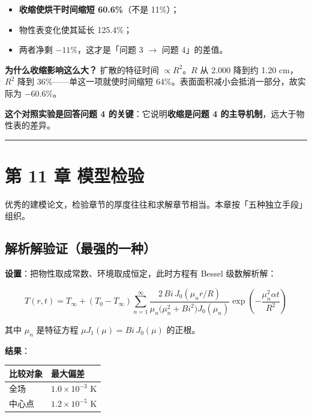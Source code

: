 \begin{itemize}
\item \textbf{收缩使烘干时间缩短 60.6\%}（不是 11\%）；
\item 物性表变化使其延长 125.4\%；
\item 两者净剩 $-11\%$，这才是「问题 3 $\rightarrow$ 问题 4」的差值。
\end{itemize}


\textbf{为什么收缩影响这么大？} 扩散的特征时间 $\propto R^2$。$R$ 从 2.000 降到约 1.20 cm，$R^2$ 降到 $36\%$——单这一项就使时间缩短 64\%。表面面积减小会抵消一部分，故实际为 $-60.6\%$。


\textbf{这个对照实验是回答问题 4 的关键}：它说明\textbf{收缩是问题 4 的主导机制}，远大于物性表的差异。


\vspace{1mm}\hrule\vspace{1mm}


\section{第 11 章 模型检验}


优秀的建模论文，检验章节的厚度往往和求解章节相当。本章按「五种独立手段」组织。


\subsection{解析解验证（最强的一种）}


\textbf{设置}：把物性取成常数、环境取成恒定，此时方程有 Bessel 级数解析解：


\begin{equation*}
T(r,t)=T_\infty+(T_0-T_\infty)\sum_{n=1}^{\infty}\frac{2\,Bi\,J_0(\mu_n r/R)}{\mu_n\big(\mu_n^2+Bi^2\big)J_0(\mu_n)}\exp\!\left(-\frac{\mu_n^2\alpha t}{R^2}\right)
\end{equation*}


其中 $\mu_n$ 是特征方程 $\mu J_1(\mu)=Bi\,J_0(\mu)$ 的正根。


\textbf{结果}：


\begin{center}
\small
\begin{tabular}{ll}
\toprule
比较对象 & 最大偏差 \\
\midrule
全场 & $1.0\times10^{-3}$ K \\
中心点 & $1.2\times10^{-5}$ K \\
\bottomrule
\end{tabular}
\end{center}



